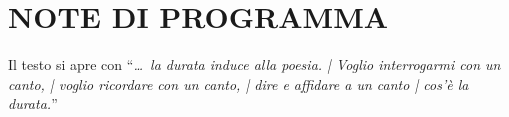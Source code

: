 \newcommand{\mylanguages}{italian} %
\newcommand{\mytitle}{Risonanze Erranti - Luigi Nono}
\newcommand{\mysubtitle}{Appunti AECLE}
\newcommand{\authorone}{Giuseppe SILVI}
\newcommand{\institutione}{Accademia S. Cecilia di Roma}
\newcommand{\emailone}{grammaton @ me.com}


\maketitle
\thispagestyle{empty}
\section*{NOTE DI PROGRAMMA}

Il testo si apre con “\emph{… la durata induce alla poesia. | Voglio interrogarmi con
un canto, | voglio ricordare con un canto, | dire e affidare a un canto | cos'è
la durata.}”

